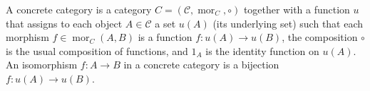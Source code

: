 A concrete category is a category $C = (\mathcal{C}, \operatorname{mor}_C, \circ)$ together with a function $u$ that assigns to each object $A \in \mathcal{C}$ a set $u(A)$ (its underlying set) such that each morphism $f \in \operatorname{mor}_C(A, B)$ is a function $f: u(A) \to u(B)$, the composition $\circ$ is the usual composition of functions, and $1_A$ is the identity function on $u(A)$. An isomorphism $f: A \to B$ in a concrete category is a bijection $f: u(A) \to u(B)$.
